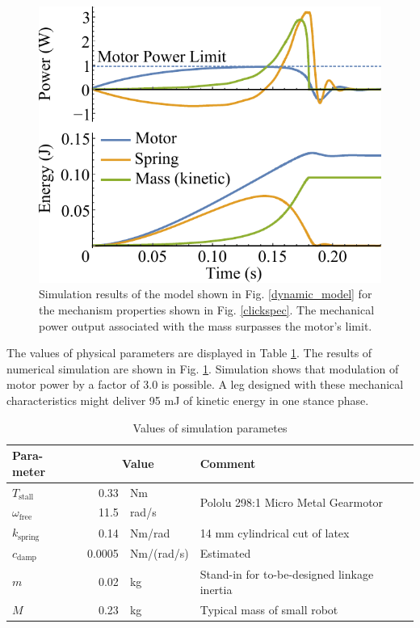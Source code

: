 \documentclass[journal]{IEEEtran}
\begin{document}
\begin{figure}[!t]
\centering
\includegraphics[scale=0.55]{simulation_results}
\caption{Simulation results of the model shown in Fig. \ref{dynamic_model} for the mechanism properties shown in Fig. \ref{clickspec}.  The mechanical power output associated with the mass surpasses the motor's limit.}
\label{simulation_results}
\end{figure}





The values of physical parameters are displayed in Table \ref{simulation_parameters}.
The results of numerical simulation are shown in Fig. \ref{simulation_results}.
Simulation shows that modulation of motor power by a factor of 3.0 is possible.
A leg designed with these mechanical characteristics might deliver 95 mJ of kinetic energy in one stance phase.


\begin{table}[h]
\caption{Values of simulation parametes}
\label{simulation_parameters}
\centering
\begin{tabular}{|m{6mm}|r@{ }l|m{48mm}|}
\hline
\textbf{Para-meter} & \multicolumn{2}{c|}{\textbf{Value}} & \textbf{Comment} \\
\hline
$T_\text{stall}$ & 0.33 & Nm & \multirow{2}[4]{*}{Pololu 298:1 Micro Metal Gearmotor} \\
\cline{1-3}$\omega_\text{free}$ & 11.5 & rad/s &  \\
\hline
$k_\text{spring}$ & 0.14 & Nm/rad & 14 mm cylindrical cut of latex \\
\hline
$c_\text{damp}$ & 0.0005 & Nm/(rad/s) & Estimated \\
\hline
$m$ & 0.02 & kg & Stand-in for to-be-designed linkage inertia \\
\hline
$M$ & 0.23 & kg & Typical mass of small robot \\
\hline
\end{tabular}
\end{table}
\end{document}
